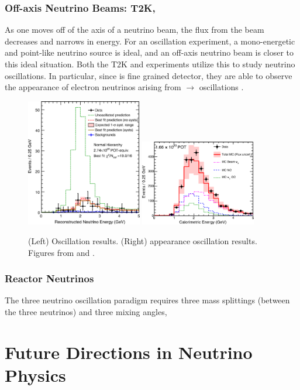 \subsubsection{Off-axis Neutrino Beams: T2K, \nova}
As one moves off of the axis of a neutrino beam, the flux from the beam decreases and narrows in energy.  For an oscillation experiment, a mono-energetic and point-like neutrino source is ideal, and an off-axis neutrino beam is closer to this ideal situation.  Both the T2K \cite{PhysRevLett.112.181801} and \nova \cite{PhysRevD.93.051104} experiments utilize this to study neutrino oscillations.  In particular, since \nova is fine grained detector, they are able to observe the appearance of electron neutrinos arising from \numu $\rightarrow$ \nue oscillations \cite{Adamson:2016tbq}.

\begin{figure}[htbp]
  \centering
  \includegraphics[width=0.45\textwidth]{intro_figures/nova_numu.png}
  \includegraphics[width=0.45\textwidth]{intro_figures/nova_nue.png}
  \caption[\nova Oscillation Results]{(Left) \numu Oscillation results. (Right) \nue appearance oscillation results.  Figures from \cite{PhysRevD.93.051104} and \cite{Adamson:2016tbq}.}
  \label{fig:label}
\end{figure}

\subsubsection{Reactor Neutrinos}

The three neutrino oscillation paradigm requires three mass splittings (between the three neutrinos) and three mixing angles, 

\section{Future Directions in Neutrino Physics}
\label{sec:future_experiments}

